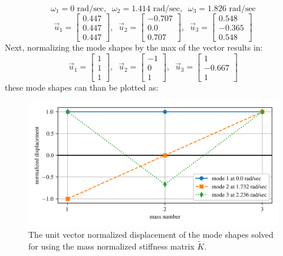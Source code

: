 \documentclass[12pt,letter]{article}
\begin{document}
\begin{example}
	\begin{equation}
	\omega_1 = 0  \text{ rad/sec}, \; \; \omega_2 = 1.414 \text{ rad/sec}, \; \; \omega_3 = 1.826  \text{ rad/sec}
	\end{equation}
	\begin{equation}
	\vec{u}_1 = \begin{bmatrix} 0.447 \\   0.447 \\    0.447 \end{bmatrix}, \; \; \vec{u}_2 = \begin{bmatrix} -0.707 \\    0.0 \\    0.707 \end{bmatrix}, \; \; \vec{u}_3 = \begin{bmatrix} 0.548 \\    -0.365 \\    0.548  \end{bmatrix}
	\end{equation}
	Next, normalizing the mode shapes by the max of the vector results in:
	\begin{equation}
	\vec{u}_1 = \begin{bmatrix} 1 \\    1 \\    1  \end{bmatrix}, \; \; \vec{u}_2 = \begin{bmatrix} -1 \\    0 \\    1 \end{bmatrix}, \; \; \vec{u}_3 = \begin{bmatrix} 1 \\    -0.667 \\    1  \end{bmatrix}
	\end{equation}
	these mode shapes can than be plotted as:
	\begin{figure}[H]
		\centering
		\includegraphics[width=\linewidth]{../figures/mode_shape_aiplane_example_normalized_stiffness.png}
		\caption{The unit vector normalized displacement of the mode shapes solved for using the mass normalized stiffness matrix $\tilde{K}$.}
		\label{fig:mode_shape_aiplane_example_normalized_stiffness}
	\end{figure}
	

\end{example}
\end{document}
